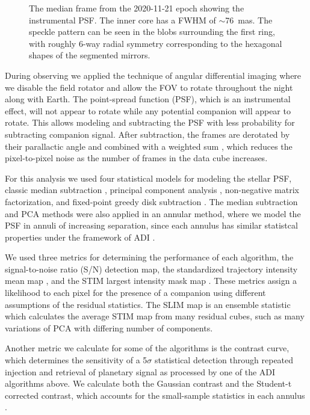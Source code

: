 \documentclass[twocolumn]{aastex631}
\begin{document}
\begin{figure}
    \centering
    \caption{The median frame from the 2020-11-21 epoch showing the instrumental PSF. The inner core has a FWHM of $\sim$\SI{76}{mas}. The speckle pattern can be seen in the blobs surrounding the first ring, with roughly 6-way radial symmetry corresponding to the hexagonal shapes of the segmented mirrors.}
    \label{fig:psf}
\end{figure}

During observing we applied the technique of angular differential imaging \citep[ADI;][]{marois_angular_2006} where we disable the field rotator and allow the FOV to rotate throughout the night along with Earth. The point-spread function (PSF), which is an instrumental effect, will not appear to rotate while any potential companion will appear to rotate. This allows modeling and subtracting the PSF with less probability for subtracting companion signal. After subtraction, the frames are derotated by their parallactic angle and combined with a weighted sum \citep{bottom_noise-weighted_2017}, which reduces the pixel-to-pixel noise as the number of frames in the data cube increases.

For this analysis we used four statistical models for modeling the stellar PSF, classic median subtraction \citep{marois_angular_2006}, principal component analysis \citep[PCA;][]{soummer_detection_2012}, non-negative matrix factorization\citep[NMF;][]{ren_non-negative_2018}, and fixed-point greedy disk subtraction \citep[GreeDS;][]{pairet_reference-less_2019,pairet_mayonnaise_2020}. The median subtraction and PCA methods were also applied in an annular method, where we model the PSF in annuli of increasing separation, since each annulus has similar statistcal properties under the framework of ADI \citep{marois_angular_2006}.

We used three metrics for determining the performance of each algorithm, the signal-to-noise ratio (S/N) detection map, the standardized trajectory intensity mean map \citep[STIM map;][]{pairet_stim_2019}, and the STIM largest intensity mask map \citep[SLIM map;][]{pairet_signal_2020}. These metrics assign a likelihood to each pixel for the presence of a companion using different assumptions of the residual statistics. The SLIM map is an ensemble statistic which calculates the average STIM map from many residual cubes, such as many variations of PCA with differing number of components.

Another metric we calculate for some of the algorithms is the contrast curve, which determines the sensitivity of a 5$\sigma$ statistical detection through repeated injection and retrieval of planetary signal as processed by one of the ADI algorithms above. We calculate both the Gaussian contrast and the Student-t corrected contrast, which accounts for the small-sample statistics in each annulus \citep{mawet_fundamental_2014}.
\end{document}
